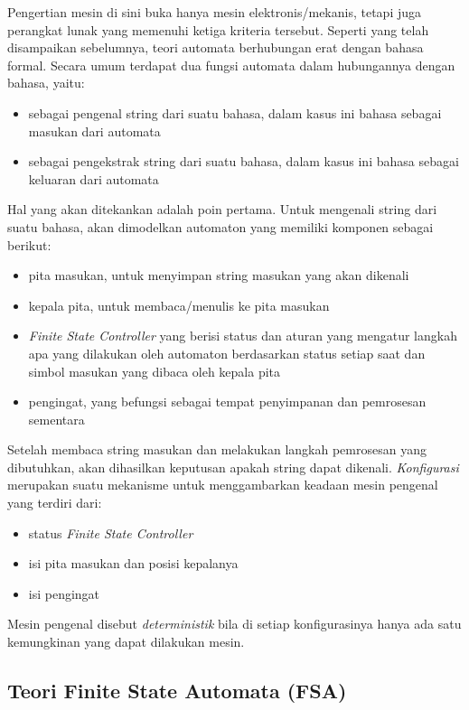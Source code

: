Pengertian mesin di sini buka hanya mesin elektronis/mekanis, tetapi juga perangkat lunak yang memenuhi ketiga kriteria tersebut. Seperti yang telah disampaikan sebelumnya, teori automata berhubungan erat dengan bahasa formal. Secara umum terdapat dua fungsi automata dalam hubungannya dengan bahasa, yaitu:

\begin{itemize}
	\item sebagai pengenal string dari suatu bahasa, dalam kasus ini bahasa sebagai masukan dari automata
	\item sebagai pengekstrak string dari suatu bahasa, dalam kasus ini bahasa sebagai keluaran dari automata
\end{itemize}

Hal yang akan ditekankan adalah poin pertama. Untuk mengenali string dari suatu bahasa, akan dimodelkan automaton yang memiliki komponen sebagai berikut:

\begin{itemize}
	\item pita masukan, untuk menyimpan string masukan yang akan dikenali
	\item kepala pita, untuk membaca/menulis ke pita masukan 
	\item \textit{Finite State Controller} yang berisi status dan aturan yang mengatur langkah apa yang dilakukan oleh automaton berdasarkan status setiap saat dan simbol masukan yang dibaca oleh kepala pita
	\item pengingat, yang befungsi sebagai tempat penyimpanan dan pemrosesan sementara
\end{itemize}

Setelah membaca string masukan dan melakukan langkah pemrosesan yang dibutuhkan, akan dihasilkan keputusan apakah string dapat dikenali. \textit{Konfigurasi} merupakan suatu mekanisme untuk menggambarkan keadaan mesin pengenal yang terdiri dari:

\begin{itemize}
	\item status \textit{Finite State Controller}
	\item isi pita masukan dan posisi kepalanya
	\item isi pengingat
\end{itemize}

Mesin pengenal disebut \textit{deterministik} bila di setiap konfigurasinya hanya ada satu kemungkinan yang dapat dilakukan mesin.

\subsection{Teori Finite State Automata (FSA)\cite{Frisca:2014}}

